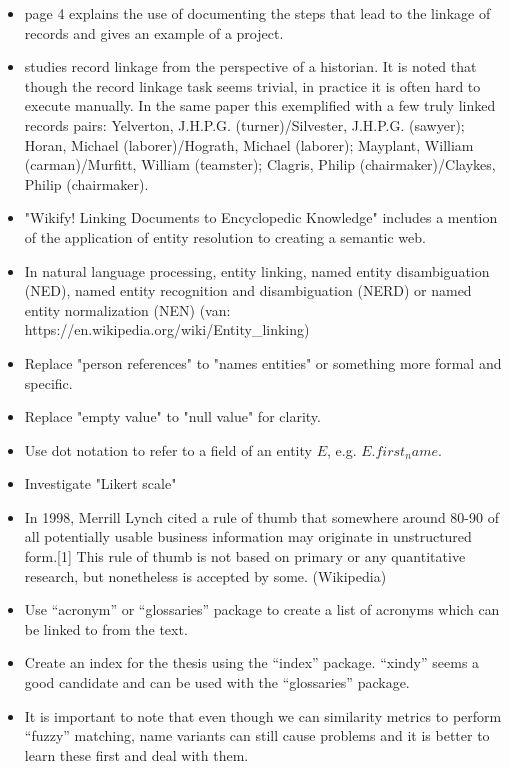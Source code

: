 \documentclass{article}
\begin{document}
\begin{itemize}
    \item \cite{Winchester1970} page 4 explains the use of documenting the steps that lead to the linkage of records and gives an example of a project.
    \item \cite{Winchester1970} studies record linkage from the perspective of a historian. It is noted that though the record linkage task seems trivial, in practice it is often hard to execute manually. In the same paper this exemplified with a few truly linked records pairs: Yelverton, J.H.P.G. (turner)/Silvester, J.H.P.G. (sawyer); Horan, Michael (laborer)/Hograth, Michael (laborer); Mayplant, William (carman)/Murfitt, William (teamster); Clagris, Philip (chairmaker)/Claykes, Philip (chairmaker).
    \item "Wikify! Linking Documents to Encyclopedic Knowledge" includes a mention of the application of entity resolution to creating a semantic web.
    \item In natural language processing, entity linking, named entity disambiguation (NED), named entity recognition and disambiguation (NERD) or named entity normalization (NEN) (van: https://en.wikipedia.org/wiki/Entity_linking)
    \item Replace "person references" to "names entities" or something more formal and specific.
    \item Replace "empty value" to "null value" for clarity.
    \item Use dot notation to refer to a field of an entity $E$, e.g. $E.first_name$.
    \item Investigate "Likert scale"
    \item In 1998, Merrill Lynch cited a rule of thumb that somewhere around 80-90 of all potentially usable business information may originate in unstructured form.[1] This rule of thumb is not based on primary or any quantitative research, but nonetheless is accepted by some. (Wikipedia)
    \item Use ``acronym'' or ``glossaries'' package to create a list of acronyms which can be linked to from the text.
    \item Create an index for the thesis using the ``index'' package. ``xindy'' seems a good candidate and can be used with the ``glossaries'' package.
    \item It is important to note that even though we can similarity metrics to perform ``fuzzy'' matching, name variants can still cause problems and it is better to learn these first and deal with them.

\end{itemize}
\end{document}
